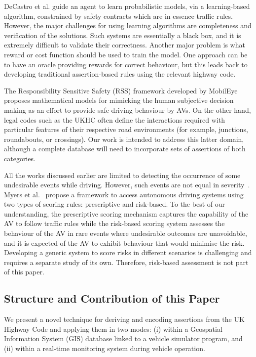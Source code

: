 DeCastro et al. \cite{decastro} guide an agent to learn probabilistic models, via a learning-based algorithm, constrained by safety contracts which are in essence traffic rules. However, the major challenges for using learning algorithms are completeness and verification of the solutions. Such systems are essentially a black box, and it is extremely difficult to validate their correctness. Another major problem is what reward or cost function should be used to train the model. One approach can be to have an oracle providing rewards for correct behaviour, but this leads back to developing traditional assertion-based rules using the relevant highway code.

The Responsibility Sensitive Safety (RSS) framework developed by MobilEye~\cite{RSS_Shalev_Shwartz2017, RSS2_Koopman2019} proposes mathematical models for mimicking the human subjective decision making as an effort to provide safe driving behaviour by AVs. On the other hand, legal codes such as the UKHC often define the interactions required with particular features of their respective road environments (for example, junctions, roundabouts, or crossings). Our work is intended to address this latter domain, although a complete database will need to incorporate sets of assertions of both categories. 

All the works discussed earlier are limited to detecting the occurrence of some undesirable events while driving. However, such events are not equal in severity~\cite{sinha}. Myers et al.~\cite{myers} propose a framework to access autonomous driving systems using two types of scoring rules: prescriptive and risk-based. To the best of our understanding, the prescriptive scoring mechanism captures the capability of the AV to follow traffic rules while the risk-based scoring system assesses the behaviour of the AV in rare events where undesirable outcomes are unavoidable, and it is expected of the AV to exhibit behaviour that would minimise the risk. Developing a generic system to score risks in different scenarios is challenging and requires a separate study of its own. Therefore, risk-based assessment is not part of this paper.

\subsection{Structure and Contribution of this Paper}
We present a novel technique for deriving and encoding assertions from the UK Highway Code and applying them in two modes: (i) within a Geospatial Information System (GIS) database linked to a vehicle simulator program, and (ii) within a real-time monitoring system during vehicle operation.

